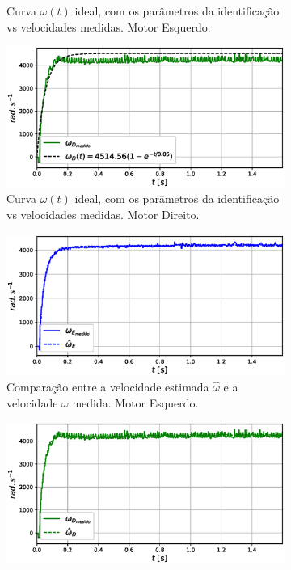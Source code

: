 \begin{figure}[H]
\begin{subfigure}{.5\textwidth}
    \caption{Curva $\omega(t)$ ideal, com os parâmetros da identificação vs velocidades medidas. Motor Esquerdo.}
    \label{fig:exp02:regressao_medido_esquerdo}
    \end{subfigure}
    \hfill
    \begin{subfigure}{.5\textwidth}
    \centering
    \includegraphics[width=\textwidth]{figuras/resultados/exp02/regressao_vs_medido_direito100.eps}
    \caption{Curva $\omega(t)$ ideal, com os parâmetros da identificação vs velocidades medidas. Motor Direito.}
    \label{fig:exp02:regressao_medido_direito}
    \end{subfigure}
    \hfill
    \begin{subfigure}{.5\textwidth}
    \centering
    \includegraphics[width=\textwidth]{figuras/resultados/exp02/filtro_vs_sem_filtro_esquerdo100.eps}
    \caption{Comparação entre a velocidade estimada $\hat{\omega}$ e a velocidade $\omega$ medida. Motor Esquerdo.}
    \label{fig:exp02:filtragem_esquerdo}
    \end{subfigure}
    \hfill
    \begin{subfigure}{.5\textwidth}
    \centering
    \includegraphics[width=\textwidth]{figuras/resultados/exp02/filtro_vs_sem_filtro_direito100.eps}

\end{subfigure}
\end{figure}
